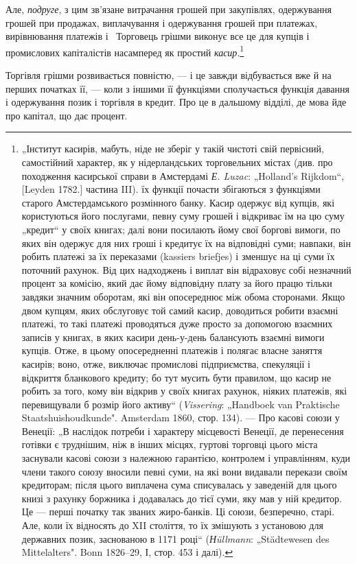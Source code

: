 Але, \emph{подруге}, з цим зв’язане витрачання грошей при закупівлях,
одержування грошей при продажах, виплачування і одержування
грошей при платежах, вирівнювання платежів і~
Торговець грішми виконує все це для купців і промислових
капіталістів насамперед як простий \emph{касир}.\footnote{
„Інститут касирів, мабуть, ніде не зберіг у такій чистоті свій первісний,
самостійний характер, як у нідерландських торговельних містах (див. про
походження касирської справи в Амстердамі \emph{Е. Luzac}: „Holland’s Rijkdom“,
[Leyden 1782.] частина III). їх функції почасти збігаються з функціями старого
Амстердамського розмінного банку. Касир одержує від купців, які користуються
його послугами, певну суму грошей і відкриває їм на цю суму „кредит“
у своїх книгах; далі вони посилають йому свої боргові вимоги, по яких він
одержує для них гроші і кредитує їх на відповідні суми; навпаки, він робить
платежі за їх переказами (kassiers briefjes) і зменшує на ці суми їх поточний
рахунок. Від цих надходжень і виплат він відраховує собі незначний процент
за комісію, який дає йому відповідну плату за його працю тільки завдяки
значним оборотам, які він опосереднює між обома сторонами. Якщо двом купцям,
яких обслуговує той самий касир, доводиться робити взаємні платежі, то
такі платежі проводяться дуже просто за допомогою взаємних записів у книгах,
в яких касири день-у-день балансують взаємні вимоги купців. Отже, в цьому
опосередненні платежів і полягає власне заняття касирів; воно, отже, виключає
промислові підприємства, спекуляції і відкриття бланкового кредиту; бо тут
мусить бути правилом, що касир не робить за того, кому він відкрив у своїх
книгах рахунок, ніяких платежів, які перевищували б розмір його активу“
(\emph{Vissering}: „Handboek van Praktische Staatshuishoudkunde". Amsterdam 1860,
стор. 134). — Про касові союзи у Венеції: „В наслідок потреби і характеру
місцевості Венеції, де перенесення готівки є труднішим, ніж в інших місцях,
гуртові торговці цього міста заснували касові союзи з належною гарантією,
контролем і управлінням, куди члени такого союзу вносили певні суми, на
які вони видавали перекази своїм кредиторам; після цього виплачена сума
списувалась у заведеній для цього книзі з рахунку боржника і додавалась до
тієї суми, яку мав у ній кредитор. Це — перші початку так званих жиро-банків.
Ці союзи, безперечно, старі. Але, коли їх відносять до XII століття, то їх
змішують з установою для державних позик, заснованою в 1171 році“ (\emph{Нüllmann}:
„Städtewesen des Mittelalters". Bonn 1826--29, І, стор. 453 і далі).
}

Торгівля грішми розвивається повністю, — і це завжди відбувається
вже й на перших початках її, — коли з іншими її функціями
сполучається функція давання і одержування позик і торгівля
в кредит. Про це в дальшому відділі, де мова йде про капітал,
що дає процент.
